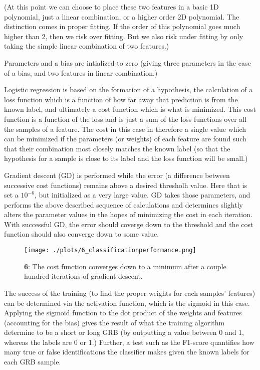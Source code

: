 (At this point we can choose to place these two features in a basic 1D polynomial, just a linear combination, or a higher order 2D polynomial. The distinction comes in proper fitting. If the order of this polynomial goes much higher than 2, then we risk over fitting. But we also risk under fitting by only taking the simple linear combination of two features.)

Parameters and a bias are intialized to zero (giving three parameters in the case of a bias, and two features in linear combination.)

Logistic regression is based on the formation of a hypothesis, the calculation of a loss function which is a function of how far away that prediction is from the known label, and ultimately a cost function which is what is minimized. This cost function is a function of the loss and is just a sum of the loss functions over all the samples of a feature. The cost in this case in therefore a single value which can be minimized if the parameters (or weights) of each feature are found such that their combination most closely matches the known label (so that the hypothesis for a sample is close to its label and the loss function will be small.)

Gradient descent (GD) is performed while the error (a difference between successive cost functions) remains above a desired thresholh value. Here that is set a $10^{-6}$, but initialized as a very large value. GD takes those parameters, and performs the above described sequence of calculations and determines slightly alters the parameter values in the hopes of minimizing the cost in each iteration. With successful GD, the error should coverge down to the threshold and the cost function should also converge down to some value.

\begin{figure}[h!]
  \centering
  \texttt{[image: ./plots/6\_classificationperformance.png]}
  \caption{\textbf{6}: The cost function converges down to a minimum after a couple hundred iterations of gradient descent.}
  \label{fig:classificationperformance}
\end{figure}

The success of the training (to find the proper weights for each samples' features) can be determined via the activation function, which is the sigmoid in this case. Applying the sigmoid function to the dot product of the weights and features (accounting for the bias) gives the result of what the training algorithm determine to be a short or long GRB (by outputting a value between 0 and 1, whereas the labels are 0 or 1.) Further, a test such as the F1-score quantifies how many true or false identifications the classifier makes given the known labels for each GRB sample.

